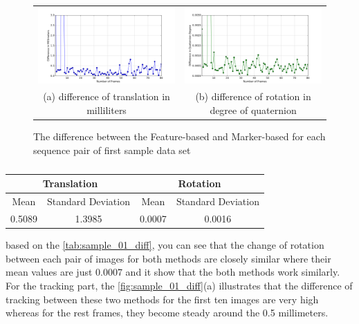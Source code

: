 \begin{figure}[H]
\begin{tabular}{cc}
  \includegraphics[width=80mm]{figures/diff_0/graph_translation} &  \includegraphics[width=80mm]{figures/diff_0/graph_rotation} \\
(a) difference of translation in milliliters & (b) difference of rotation in degree of quaternion \\[6pt]
\end{tabular}
\caption{The difference between the Feature-based and Marker-based for each sequence pair of first sample data set}\label{fig:sample_01_diff}
\end{figure}

\begin{table}[H]
\centering
  \begin{tabular}{| c | c | c | c |}
      \hline
      \multicolumn{2}{|c|}{Translation} & \multicolumn{2}{c|}{Rotation} \\ \hline
       Mean & Standard Deviation & Mean & Standard Deviation \\ \hline
      0.5089 & 1.3985 & 0.0007 & 0.0016 \\ \hline
  \end{tabular}
  \caption{} \label{tab:sample_01_diff}
\end{table}

based on the \autoref{tab:sample_01_diff}, you can see that the change of rotation between each pair of images for both methods are closely similar where their mean values are just 0.0007 and it show that the both methods work similarly. For the tracking part, the \autoref{fig:sample_01_diff}(a) illustrates that the difference of tracking between these two methods for the first ten images are very high whereas for the rest frames, they become steady around the 0.5 millimeters.

